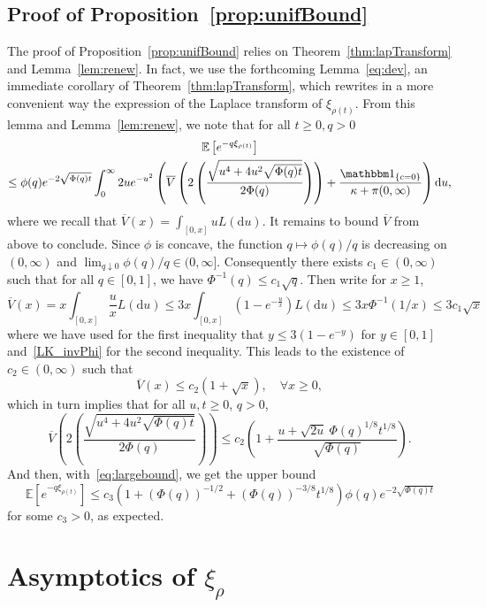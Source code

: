 \documentclass[AHL,Unicode,longabstracts,published]{cedram}
\newcommand{\bbE}{\mathbb{E}}
\newcommand{\dd}{\mathrm{d}}
\renewcommand{\bar}[1]{\overline{#1}}
\let\oldforall\forall
\renewcommand*{\forall}{\mathrel{\oldforall}}
\begin{document}
\subsection{Proof of Proposition~\ref{prop:unifBound}}\label{sec:bounds}

The proof of Proposition~\ref{prop:unifBound} relies on Theorem~\ref{thm:lapTransform} and Lemma~\ref{lem:renew}. In fact, we use the forthcoming Lemma~\ref{eq:dev}, an immediate corollary of Theorem~\ref{thm:lapTransform}, which rewrites in a more convenient way the expression of the Laplace transform of $\xi_{\rho(t)}$. From this lemma and Lemma~\ref{lem:renew}, we note that for all $t \geq 0,q>0$
\begin{multline}\label{eq:largebound}
\bbE\left[e^{-q\xi_{\rho(t)}}\right] \\
\leq \phi(q)
e^{-2 \sqrt{\Phi(q)t}}
\int_0^\infty 2u e^{-u^2}
\left(\bar V\left(2
\left(\frac{\sqrt{u^4+4u^2 \sqrt{\Phi(q) t}}}
{2 \Phi(q)} \right)\right)
+ \frac{\mathbbm 1_{\{c=0\}}}
{\kappa+\pi(0,\infty
)} \right)\dd u
,
\end{multline}
where we recall that $\bar V(x)=\int_{[0,x]}u L(\dd u)$. It remains to bound $\bar V$ from above to conclude. Since $\phi$ is concave, the function $q \mapsto \phi(q)/q$ is decreasing on $(0,\infty)$ and $\lim_{q \downarrow 0} \phi(q)/q \in (0,\infty]$. Consequently there exists $c_1 \in (0,\infty)$ such that for all $q \in [0,1]$, we have $\Phi^{-1}(q) \leq c_1 \sqrt q$. Then write for $x \geq 1$,
\[
\bar V(x) = x\int_{[0,x]} \frac{u}{x} L(\dd u) \leq 3 x \int_{[0,x]} \left(1-e^{- \frac{u}{x}} \right) L(\dd u) \leq 3 x \Phi^{-1}(1/x) \leq 3c_1 \sqrt x
\]
where we have used for the first inequality that $y \leq 3(1-e^{-y})$ for $y \in [0,1]$ and~\eqref{LK_invPhi} for the second inequality. This leads to the existence of $c_2 \in (0,\infty)$ such that
\[
\bar V(x) \leq c_2 \left(1 + \sqrt x\right), \quad \forall x \geq 0,
\]
which in turn implies that for all $u,t \geq 0$, $q>0$,
\[
\bar V\left(2 \left(\frac{\sqrt{u^4+4u^2 \sqrt{\Phi(q) t}}}{2 \Phi(q)} \right)\right) \leq c_2 \left(1 + \frac{u+\sqrt{2u} \ \Phi(q)^{1/8}t^{1/8}}{\sqrt{\Phi(q)}}\right).
\]
And then, with~\eqref{eq:largebound}, we get the upper bound
\[
\bbE\left[e^{-q\xi_{\rho(t)}}\right] \leq c_3\left(1+(\Phi(q))^{-1/2}+(\Phi(q))^{-3/8}t^{1/8} \right) \phi(q)e^{-2 \sqrt{\Phi(q)t}}
\]
for some $c_3>0$, as expected.



\section{Asymptotics of \texorpdfstring{$\xi_{\rho}$}{xiRho}}\label{sec:asymptotic_sub}
\end{document}
